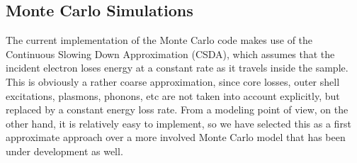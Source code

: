 \documentclass[DIV=calc, paper=letter, fontsize=11pt]{scrartcl}	 %
\begin{document}
%
%
%

\newpage
\subsection{Monte Carlo Simulations \label{sec:MC}}
The current implementation of the Monte Carlo code makes use of the Continuous Slowing Down Approximation (CSDA),
which assumes that the incident electron loses energy at a constant rate as it travels inside the sample.  This is obviously a
rather coarse approximation, since core losses, outer shell excitations, plasmons, phonons, etc are not taken into account
explicitly, but replaced by a constant energy loss rate.  From a modeling point of view, on the other hand, it is relatively easy
to implement, so we have selected this as a first approximate approach over a more involved Monte Carlo model that has been
under development as well.  
\end{document}
